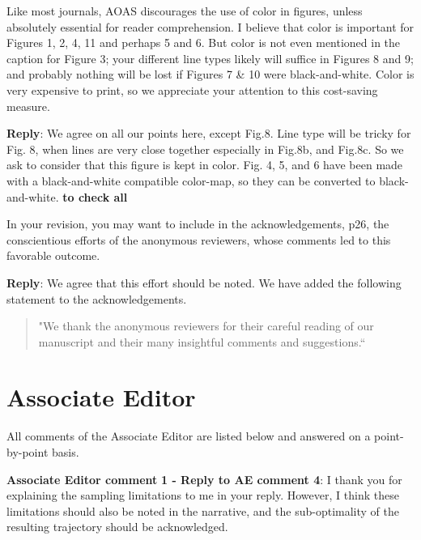 \documentclass[a4paper]{article}
\newcounter{reviewer}
\def\aecom{\textbf{Associate Editor comment }}
\def\reply{\textbf{Reply}}
\begin{document}
\vspace{5mm}
 Like most journals, AOAS discourages the use of color in figures,
unless absolutely essential for reader comprehension.  I believe
that color is important for Figures 1, 2, 4, 11 and perhaps 5 and 6.
But color is not even mentioned in the caption for Figure 3; your
different line types likely will suffice in Figures 8 and 9; and
probably nothing will be lost if Figures 7 & 10 were black-and-white.
Color is very expensive to print, so we appreciate your attention
to this cost-saving measure.

\vspace{5mm}
\reply: We agree on all our points here, except Fig.8. Line type will be tricky for Fig. 8, when lines are very close together especially in Fig.8b, and Fig.8c. So we ask to consider that this figure is kept in color. Fig. 4, 5, and 6 have been made with a black-and-white compatible color-map, so they can be converted to black-and-white. {\bf{to check all}}

\vspace{5mm}
 In your revision, you may want to include in the
acknowledgements, p26, the conscientious efforts of the anonymous
reviewers, whose comments led to this favorable outcome.

\vspace{5mm}
\reply: We agree that this effort should be noted. We have added the following statement to the acknowledgements.

\begin{quote}
"We thank the anonymous reviewers for their careful reading of our manuscript and their many insightful comments and suggestions.``
\end{quote}

 \section*{Associate Editor}
All comments of the Associate Editor are listed below and answered on a point-by-point basis.

\setcounter{reviewer}{1}

\vspace{5mm}
\noindent \aecom \textbf{1 - Reply to AE comment 4}: 
I thank you for explaining the sampling limitations to me in your reply.  However, I think these limitations should also be noted in the narrative, and the sub-optimality of the resulting trajectory should be acknowledged.
\end{document}
